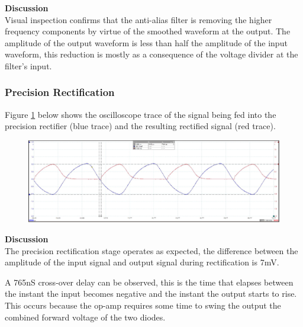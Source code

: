 \textbf{Discussion}\\
Visual inspection confirms that the anti-alias filter is removing the higher frequency components by virtue of the smoothed waveform at the output. The amplitude of the output waveform is less than half the amplitude of the input waveform, this reduction is mostly as a consequence of the voltage divider at the filter's input.

\subsubsection{Precision Rectification}

Figure \ref{fig:precision_rectification} below shows the oscilloscope trace of the signal being fed into the precision rectifier (blue trace) and the resulting rectified signal (red trace).

\begin{figure}[H]
	\centering
	\includegraphics[width=\textwidth]{figures/results/rectification/36kHz.JPG}
	\label{fig:precision_rectification}
\end{figure}

\textbf{Discussion}\\
The precision rectification stage operates as expected, the difference between the amplitude of the input signal and output signal during rectification is 7mV.

A 765nS cross-over delay can be observed, this is the time that elapses between the instant the input becomes negative and the instant the output starts to rise. This occurs because the op-amp requires some time to swing the output the combined forward voltage of the two diodes.








